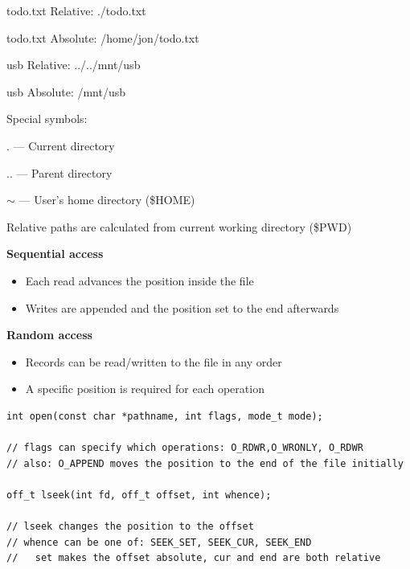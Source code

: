 \begin{slide}
    

    todo.txt Relative: ./todo.txt

    todo.txt Absolute: /home/jon/todo.txt

    usb Relative: ../../mnt/usb

    usb Absolute: /mnt/usb
    \bigskip

    Special symbols:

    \leftspace{}. --- Current directory
    
    \leftspace{}.. ---  Parent directory

    \leftspace{}$\mathsf{\sim}$ --- User's home directory (\$HOME)
    \bigskip

    Relative paths are calculated from current working directory (\$PWD)

\end{slide}

\begin{slide}
    

    \textbf{Sequential access}
    \begin{itemize}
        \item Each read advances the position inside the file
        \item Writes are appended and the position set to the end afterwards
    \end{itemize}
	\bigskip

    \textbf{Random access}
    \begin{itemize}
        \item Records can be read/written to the file in any order
        \item A specific position is required for each operation
    \end{itemize}

\end{slide}
  
\begin{slide}
    

    \begin{verbatim}
int open(const char *pathname, int flags, mode_t mode);

// flags can specify which operations: O_RDWR,O_WRONLY, O_RDWR
// also: O_APPEND moves the position to the end of the file initially

off_t lseek(int fd, off_t offset, int whence);

// lseek changes the position to the offset
// whence can be one of: SEEK_SET, SEEK_CUR, SEEK_END
//   set makes the offset absolute, cur and end are both relative
  \end{verbatim}

\end{slide}

